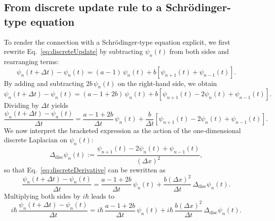 \documentclass[11pt,a4paper]{article}
\begin{document}
\subsection{From discrete update rule to a Schr\"odinger-type equation}

To render the connection with a Schr\"odinger-type equation explicit, we first rewrite Eq.~\eqref{eq:discreteUpdate} by subtracting $\psi_n(t)$ from both sides and rearranging terms:
\begin{equation}
\psi_n(t+\Delta t) - \psi_n(t) 
= (a-1)\,\psi_n(t) + b\left[\psi_{n+1}(t) + \psi_{n-1}(t)\right].
\end{equation}
By adding and subtracting $2b\,\psi_n(t)$ on the right-hand side, we obtain
\begin{equation}
\psi_n(t+\Delta t) - \psi_n(t) 
= (a-1+2b)\,\psi_n(t) + b\left[\psi_{n+1}(t)-2\psi_n(t)+\psi_{n-1}(t)\right].
\end{equation}
Dividing by $\Delta t$ yields
\begin{equation}
\frac{\psi_n(t+\Delta t) - \psi_n(t)}{\Delta t} 
= \frac{a-1+2b}{\Delta t}\,\psi_n(t) 
+ \frac{b}{\Delta t}\left[\psi_{n+1}(t)-2\psi_n(t)+\psi_{n-1}(t)\right].
\label{eq:discreteDerivative}
\end{equation}
We now interpret the bracketed expression as the action of the one-dimensional discrete Laplacian on $\psi_n(t)$:
\begin{equation}
\Delta_{\mathrm{disc}}\psi_n(t) := \frac{\psi_{n+1}(t)-2\psi_n(t)+\psi_{n-1}(t)}{(\Delta x)^2},
\end{equation}
so that Eq.~\eqref{eq:discreteDerivative} can be rewritten as
\begin{equation}
\frac{\psi_n(t+\Delta t) - \psi_n(t)}{\Delta t} 
= \frac{a-1+2b}{\Delta t}\,\psi_n(t) 
+ \frac{b(\Delta x)^2}{\Delta t}\,\Delta_{\mathrm{disc}}\psi_n(t).
\end{equation}
Multiplying both sides by $i\hbar$ leads to
\begin{equation}
i\hbar\,\frac{\psi_n(t+\Delta t) - \psi_n(t)}{\Delta t} 
= i\hbar\,\frac{a-1+2b}{\Delta t}\,\psi_n(t) 
+ i\hbar\,\frac{b(\Delta x)^2}{\Delta t}\,\Delta_{\mathrm{disc}}\psi_n(t).
\label{eq:iħDiscrete}
\end{equation}
\end{document}
